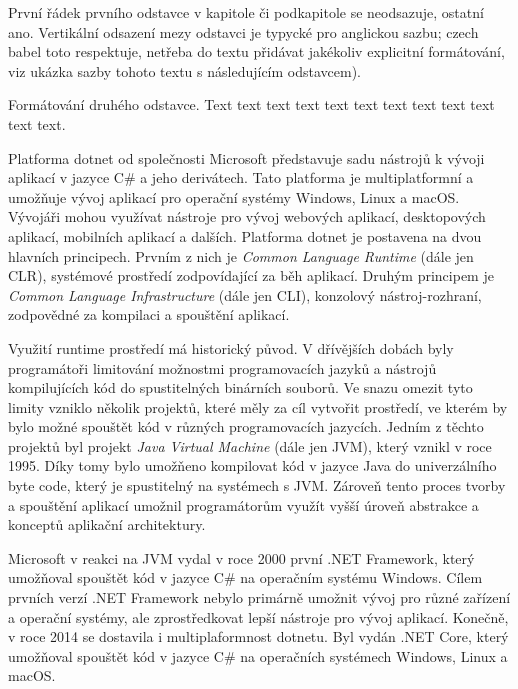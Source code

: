 
První řádek prvního odstavce v kapitole či podkapitole se neodsazuje, ostatní ano. Vertikální odsazení mezy odstavci je typycké pro anglickou sazbu; czech babel toto respektuje, netřeba do textu přidávat jakékoliv explicitní formátování, viz ukázka sazby tohoto textu s následujícím odstavcem).

Formátování druhého odstavce. Text text text text text text text text text text text text.



Platforma dotnet od společnosti Microsoft představuje sadu nástrojů k vývoji aplikací v jazyce C\# a jeho derivátech. Tato platforma je multiplatformní a umožňuje vývoj aplikací pro operační systémy Windows, Linux a macOS. Vývojáři mohou využívat nástroje pro vývoj webových aplikací, desktopových aplikací, mobilních aplikací a dalších. Platforma dotnet je postavena na dvou hlavních principech. Prvním z nich je \textit{Common Language Runtime} (dále jen CLR), systémové prostředí zodpovídající za běh aplikací. Druhým principem je \textit{Common Language Infrastructure} (dále jen CLI), konzolový nástroj-rozhraní, zodpovědné za kompilaci a spouštění aplikací. \cite{dotnet}

Využití runtime prostředí má historický původ. V dřívějších dobách byly programátoři limitování možnostmi programovacích jazyků a nástrojů kompilujících kód do spustitelných binárních souborů. Ve snazu omezit tyto limity vzniklo několik projektů, které měly za cíl vytvořit prostředí, ve kterém by bylo možné spouštět kód v různých programovacích jazycích. Jedním z těchto projektů byl projekt \textit{Java Virtual Machine} (dále jen JVM), který vznikl v roce 1995. Díky tomy bylo umožňeno kompilovat kód v jazyce Java do univerzálního byte code, který je spustitelný na systémech s JVM. Zároveň tento proces tvorby a spouštění aplikací umožnil programátorům využít vyšší úroveň abstrakce a konceptů aplikační architektury.

Microsoft v reakci na JVM vydal v roce 2000 první .NET Framework, který umožňoval spouštět kód v jazyce C\# na operačním systému Windows. Cílem prvních verzí .NET Framework nebylo primárně umožnit vývoj pro různé zařízení a operační systémy, ale zprostředkovat lepší nástroje pro vývoj aplikací. Konečně, v roce 2014 se dostavila i multiplaformnost dotnetu. Byl vydán .NET Core, který umožňoval spouštět kód v jazyce C\# na operačních systémech Windows, Linux a macOS. \cite{dotnet}

